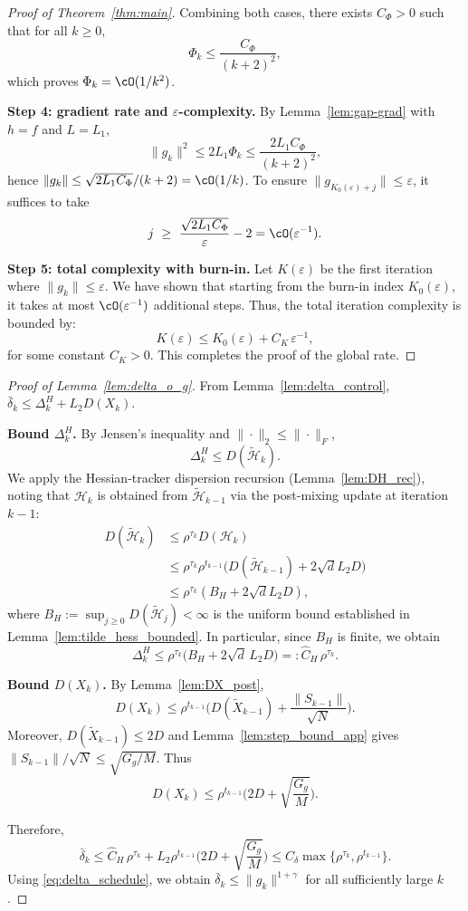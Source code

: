 \documentclass[review,onefignum,onetabnum]{siamart171218}
\begin{document}
\begin{proof}[Proof of Theorem~\ref{thm:main}]
Combining both cases, there exists $C_\Phi>0$ such that for all $k\ge 0$,
\[
\Phi_k\le \frac{C_\Phi}{(k+2)^2},
\]
which proves $\Phi_k=\cO(1/k^2)$.

\smallskip
\noindent\textbf{Step 4: gradient rate and $\varepsilon$-complexity.}
By Lemma~\ref{lem:gap-grad} with $h=f$ and $L=L_1$,
\[
\|g_k\|^2\le 2L_1\Phi_k\le \frac{2L_1 C_\Phi}{(k+2)^2},
\]
hence $\|g_k\|\le \sqrt{2L_1 C_\Phi}/(k+2)=\cO(1/k)$.
To ensure $\|g_{K_0(\varepsilon)+j}\|\le \varepsilon$, it suffices to take
\[
j\ \ge\ \frac{\sqrt{2L_1 C_\Phi}}{\varepsilon}-2
=\cO(\varepsilon^{-1}).
\]

\smallskip
\noindent\textbf{Step 5: total complexity with burn-in.}
Let $K(\varepsilon)$ be the first iteration where $\|g_k\|\le \varepsilon$. We have shown that starting from the burn-in index $K_0(\varepsilon)$, it takes at most $\cO(\varepsilon^{-1})$ additional steps. Thus, the total iteration complexity is bounded by:
\[
K(\varepsilon)\le K_0(\varepsilon)+C_K\,\varepsilon^{-1},
\]
for some constant $C_K>0$. This completes the proof of the global rate.
\end{proof}

\begin{proof}[Proof of Lemma~\ref{lem:delta_o_g}]
From Lemma~\ref{lem:delta_control}, $\bar\delta_k\le \Delta_k^H+L_2D(X_k)$.

\smallskip
\noindent\textbf{Bound $\Delta_k^H$.}
By Jensen's inequality and $\|\cdot\|_2\le \|\cdot\|_F$,
\[
\Delta_k^H\le D(\tilde{\mathcal H}_k).
\]
We apply the Hessian-tracker dispersion recursion (Lemma~\ref{lem:DH_rec}),
noting that $\mathcal H_k$ is obtained from $\tilde{\mathcal H}_{k-1}$
via the post-mixing update at iteration $k{-}1$:
\begin{align*}
D(\tilde{\mathcal H}_k)
&\le \rho^{\tau_k}D(\mathcal H_k)\\
&\le \rho^{\tau_k}\rho^{t_{k-1}}\bigl(D(\tilde{\mathcal H}_{k-1})
\!+\!2\sqrt{d}L_2D\bigr)\\
&\le \rho^{\tau_k}(B_H\!+\!2\sqrt{d}L_2D),
\end{align*}
where $B_H:=\sup_{j\ge 0}D(\tilde{\mathcal H}_j)<\infty$ is the uniform bound
established in Lemma~\ref{lem:tilde_hess_bounded}.
In particular, since $B_H$ is finite, we obtain
\[
\Delta_k^H\le \rho^{\tau_k}\big(B_H+2\sqrt{d}\,L_2D\big)
=:\hat C_H\,\rho^{\tau_k}.
\]

\smallskip
\noindent\textbf{Bound $D(X_k)$.}
By Lemma~\ref{lem:DX_post},
\[
D(X_k)\le \rho^{t_{k-1}}\Big(D(\tilde X_{k-1})+\frac{\|S_{k-1}\|}{\sqrt N}\Big).
\]
Moreover, $D(\tilde X_{k-1})\le 2D$ and Lemma~\ref{lem:step_bound_app} gives $\|S_{k-1}\|/\sqrt N\le \sqrt{G_g/M}$.
Thus
\[
D(X_k)\le \rho^{t_{k-1}}\Big(2D+\sqrt{\frac{G_g}{M}}\Big).
\]

\smallskip
Therefore,
\[
\bar\delta_k\le \hat C_H\,\rho^{\tau_k}
+L_2\rho^{t_{k-1}}\Big(2D+\sqrt{\frac{G_g}{M}}\Big)
\le C_\delta\max\{\rho^{\tau_k},\rho^{t_{k-1}}\}.
\]
Using \eqref{eq:delta_schedule}, we obtain $\bar\delta_k\le \|g_k\|^{1+\gamma}$ for all sufficiently large $k$.
\end{proof}
\end{document}
